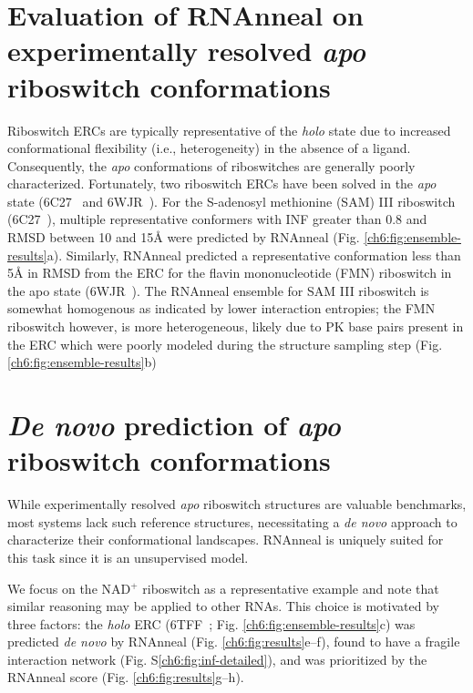 
\section{Evaluation of RNAnneal on experimentally resolved \textrm{\textbf{\textit{apo}}}  riboswitch conformations}

Riboswitch ERCs are typically representative of the {\it holo} state due to increased conformational flexibility (i.e., heterogeneity) in the absence of a ligand. Consequently, the {\it apo} conformations of riboswitches are generally poorly characterized. Fortunately, two riboswitch ERCs have been solved in the {\it apo} state (6C27~\cite{Grigg2018} and 6WJR~\cite{Wilt2020}). For the S-adenosyl methionine (SAM) III riboswitch (6C27~\cite{Grigg2018}), multiple representative conformers with INF greater than 0.8 and RMSD between  10 and 15{\AA} were predicted by RNAnneal (Fig. \ref{ch6:fig:ensemble-results}a). Similarly, RNAnneal predicted a representative conformation less than 5{\AA} in RMSD from the ERC for the flavin mononucleotide (FMN) riboswitch in the apo state (6WJR~\cite{Wilt2020}). The RNAnneal ensemble for SAM III riboswitch is somewhat homogenous as indicated by lower interaction entropies; the FMN riboswitch however, is more heterogeneous, likely due to PK base pairs present in the ERC which were poorly modeled during the structure sampling step (Fig. \ref{ch6:fig:ensemble-results}b)

\section{\textrm{\textbf{\textit{De novo}}} prediction of \textrm{\textbf{\textit{apo}}} riboswitch conformations}

While experimentally resolved {\it apo} riboswitch structures are valuable benchmarks, most systems lack such reference structures, necessitating a {\it de novo} approach to characterize their conformational landscapes. RNAnneal is uniquely suited for this task since it is an unsupervised model.

We focus on the NAD$^{+}$ riboswitch as a representative example and note that similar reasoning may be applied to other RNAs. This choice is motivated by three factors: the {\it holo} ERC (6TFF~\cite{Huang2020}; Fig. \ref{ch6:fig:ensemble-results}c) was predicted {\it de novo} by RNAnneal (Fig. \ref{ch6:fig:results}e–f), found to have a fragile interaction network (Fig. S\ref{ch6:fig:inf-detailed}), and was prioritized by the RNAnneal score (Fig. \ref{ch6:fig:results}g–h).

